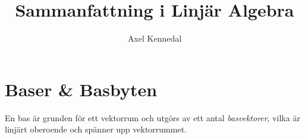 \documentclass[11pt]{article}
\author{Axel Kennedal} %
\title{Sammanfattning i Linjär Algebra}
\begin{document}
\maketitle
\tableofcontents
\newpage

\section{Baser \& Basbyten}
En bas är grunden för ett vektorrum och utgörs av ett antal \emph{basvektorer}, vilka är linjärt oberoende och spänner upp vektorrummet.
\end{document}
